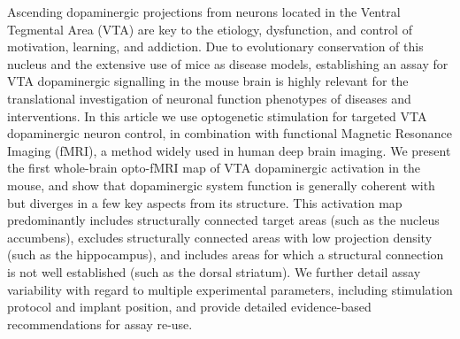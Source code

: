 Ascending dopaminergic projections from neurons located in the Ventral Tegmental Area (VTA) are key to the etiology, dysfunction, and control of motivation, learning, and addiction.
Due to evolutionary conservation of this nucleus and the extensive use of mice as disease models, establishing an assay for VTA dopaminergic signalling in the mouse brain is highly relevant for the translational investigation of neuronal function phenotypes of diseases and interventions.
In this article we use optogenetic stimulation for targeted VTA dopaminergic neuron control, in combination with functional Magnetic Resonance Imaging (fMRI), a method widely used in human deep brain imaging.
We present the first whole-brain opto-fMRI map of VTA dopaminergic activation in the mouse, and show that dopaminergic system function is generally coherent with but diverges in a few key aspects from its structure.
This activation map predominantly includes structurally connected target areas (such as the nucleus accumbens), excludes structurally connected areas with low projection density (such as the hippocampus), and includes areas for which a structural connection is not well established (such as the dorsal striatum).
We further detail assay variability with regard to multiple experimental parameters, including stimulation protocol and implant position, and provide detailed evidence-based recommendations for assay re-use.
